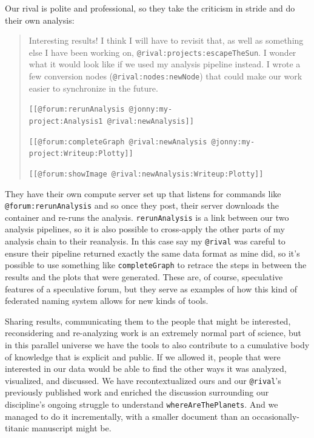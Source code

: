 \documentclass[10pt]{tufte-book}
\begin{document}
Our rival is polite and professional, so they take the criticism in
stride and do their own analysis:

\begin{quote}
Interesting results! I think I will have to revisit that, as well as
something else I have been working on,
\texttt{@rival:projects:escapeTheSun}. I wonder what it would look like
if we used my analysis pipeline instead. I wrote a few conversion nodes
(\texttt{@rival:nodes:newNode}) that could make our work easier to
synchronize in the future.

\texttt{{[}{[}@forum:rerunAnalysis\ @jonny:my-project:Analysis1\ @rival:newAnalysis{]}{]}}

\texttt{{[}{[}@forum:completeGraph\ @rival:newAnalysis\ @jonny:my-project:Writeup:Plotty{]}{]}}

\texttt{{[}{[}@forum:showImage\ @rival:newAnalysis:Writeup:Plotty{]}{]}}
\end{quote}

They have their own compute server set up that listens for commands like
\texttt{@forum:rerunAnalysis} and so once they post, their server
downloads the container and re-runs the analysis. \texttt{rerunAnalysis}
is a link between our two analysis pipelines, so it is also possible to
cross-apply the other parts of my analysis chain to their reanalysis. In
this case say my \texttt{@rival} was careful to ensure their pipeline
returned exactly the same data format as mine did, so it's possible to
use something like \texttt{completeGraph} to retrace the steps in
between the results and the plots that were generated. These are, of
course, speculative features of a speculative forum, but they serve as
examples of how this kind of federated naming system allows for new
kinds of tools.

Sharing results, communicating them to the people that might be
interested, reconsidering and re-analyzing work is an extremely normal
part of science, but in this parallel universe we have the tools to also
contribute to a cumulative body of knowledge that is explicit and
public. If we allowed it, people that were interested in our data would
be able to find the other ways it was analyzed, visualized, and
discussed. We have recontextualized ours and our \texttt{@rival}'s
previously published work and enriched the discussion surrounding our
discipline's ongoing struggle to understand \texttt{whereAreThePlanets}.
And we managed to do it incrementally, with a smaller document than an
occasionally-titanic manuscript might be.
\end{document}

